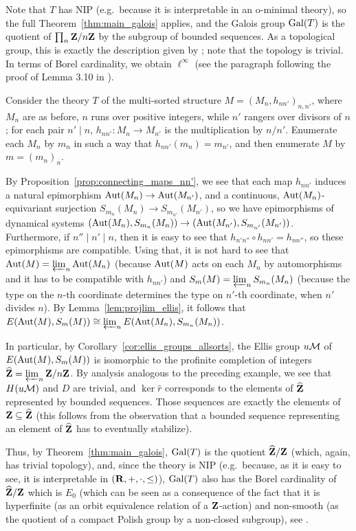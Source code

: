 \begin{ex}
		Note that $T$ has NIP (e.g.\ because it is interpretable in an o-minimal theory), so the full Theorem~\ref{thm:main_galois} applies, and the Galois group $\operatorname{{Gal}}(T)$ is the quotient of $\prod_n {\mathbf{Z}}/n{\mathbf{Z}}$ by the subgroup of bounded sequences. As a topological group, this is exactly the description given by \cite[Theorem~28]{Zie02}; note that the topology is trivial. In terms of Borel cardinality, we obtain $\ell^\infty$
		(see the paragraph following the proof of Lemma 3.10 in \cite{KPS13}).
		\xqed{\lozenge}
	\end{ex}
	
	\begin{ex}
		\label{ex:KPS}
		Consider the theory $T$ of the multi-sorted structure $M=(M_n,h_{nn'})_{n,n'}$, where $M_n$ are as before, $n$ runs over positive integers, while $n'$ rangers over divisors of $n$; for each pair $n' \mid n$, $h_{nn'}\colon M_n\to M_{n'}$ is the multiplication by $n/n'$. Enumerate each $M_n$ by $m_n$ in such a way that $h_{nn'}(m_{n})=m_{n'}$, and then enumerate $M$ by $m=(m_n)_n$.
		
		By Proposition~\ref{prop:connecting_maps_nn'}, we see that each map $h_{nn'}$ induces a natural epimorphism $\operatorname{{Aut}}(M_n)\to \operatorname{{Aut}}(M_{n'})$, and a continuous, $\operatorname{{Aut}}(M_n)$-equivariant surjection $S_{m_n}(M_n)\to S_{m_{n'}}(M_{n'})$, so we have epimorphisms of dynamical systems $(\operatorname{{Aut}}(M_n),S_{m_n}(M_n))\to (\operatorname{{Aut}}(M_{n'}),S_{m_{n'}}(M_{n'}))$. Furthermore, if $n''\mid n' \mid n$, then it is easy to see that $h_{n'n''}\circ h_{nn'}=h_{nn''}$, so these epimorphisms are compatible. Using that, it is not hard to see that $\operatorname{{Aut}}(M)=\varprojlim_n \operatorname{{Aut}}(M_n)$ (because $\operatorname{{Aut}}(M)$ acts on each $M_n$ by automorphisms and it has to be compatible with $h_{nn'}$) and $S_m(M)=\varprojlim_n S_{m_n}(M_n)$ (because the type on the $n$-th coordinate determines the type on $n'$-th coordinate, when $n'$ divides $n$). By Lemma~\ref{lem:projlim_ellis}, it follows that $E(\operatorname{{Aut}}(M),S_{m}(M))\cong \varprojlim_n E(\operatorname{{Aut}}(M_n),S_{m_n}(M_n))$.
		
		In particular, by Corollary~\ref{cor:ellis_groups_allsorts}, the Ellis group $u{\mathcal M}$ of $E(\operatorname{{Aut}}(M),S_m(M))$ is isomorphic to the profinite completion of integers $\widehat {{\mathbf{Z}}}=\varprojlim_n{\mathbf{Z}}/n{\mathbf{Z}}$. By analysis analogous to the preceding example, we see that $H(u{\mathcal M})$ and $D$ are trivial, and $\ker \hat r$ corresponds to the elements of $\widehat {{\mathbf{Z}}}$ represented by bounded sequences. Those sequences are exactly the elements of ${\mathbf{Z}}\subseteq \widehat {{\mathbf{Z}}}$ (this follows from the observation that a bounded sequence representing an element of $\widehat {{\mathbf{Z}}}$ has to eventually stabilize).
		
		Thus, by Theorem~\ref{thm:main_galois}, $\operatorname{{Gal}}(T)$ is the quotient $\widehat {{\mathbf{Z}}}/{\mathbf{Z}}$ (which, again, has trivial topology), and, since the theory is NIP (e.g.\ because, as it is easy to see, it is interpretable in $({\mathbf{R}},+,\cdot,\leq)$), $\operatorname{{Gal}}(T)$ also has the Borel cardinality of $\widehat{{\mathbf{Z}}}/{\mathbf{Z}}$ which is $E_0$ (which can be seen as a consequence of the fact that it is hyperfinite (as an orbit equivalence relation of a ${\mathbf{Z}}$-action) and non-smooth (as the quotient of a compact Polish group by a non-closed subgroup), see \cite[Theorem 8.1.1]{kanovei}.
		\xqed{\lozenge}
	\end{ex}
